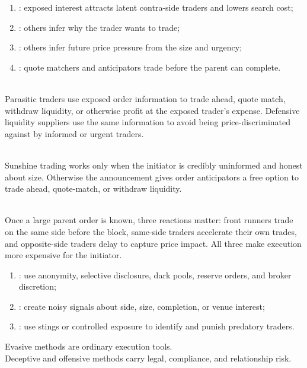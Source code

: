 \documentclass[a4paper,oneside,openany]{book}
\begin{document}
\begin{taxonomy} 
\begin{enumerate}[label=\roman*.]
\setlength{\itemsep}{0pt}
\item {}: exposed interest attracts latent contra-side traders and lowers search cost;
\item {}: others infer why the trader wants to trade;
\item {}: others infer future price pressure from the size and urgency;
\item {}: quote matchers and anticipators trade before the parent can complete.
\end{enumerate}
\end{taxonomy}

\begin{definition} \\
Parasitic traders use exposed order information to trade ahead, quote match, withdraw liquidity, or otherwise profit at the exposed trader's expense. Defensive liquidity suppliers use the same information to avoid being price-discriminated against by informed or urgent traders.
\end{definition}

\begin{caveat} \\
Sunshine trading works only when the initiator is credibly uninformed and honest about size. Otherwise the announcement gives order anticipators a free option to trade ahead, quote-match, or withdraw liquidity.
\end{caveat}

\begin{mechanism} \\
Once a large parent order is known, three reactions matter: front runners trade on the same side before the block, same-side traders accelerate their own trades, and opposite-side traders delay to capture price impact. All three make execution more expensive for the initiator.
\end{mechanism}

\begin{taxonomy} 
\begin{enumerate}[label=\roman*.]
\setlength{\itemsep}{0pt}
\item {}: use anonymity, selective disclosure, dark pools, reserve orders, and broker discretion;
\item {}: create noisy signals about side, size, completion, or venue interest;
\item {}: use stings or controlled exposure to identify and punish predatory traders.
\end{enumerate}
Evasive methods are ordinary execution tools.\\
Deceptive and offensive methods carry legal, compliance, and relationship risk.
\end{taxonomy}
\end{document}
